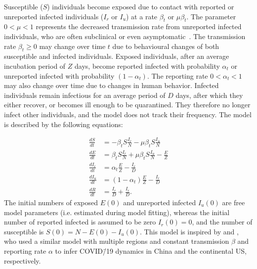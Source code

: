 \documentclass[12pt]{extarticle}
\newcommand{\covid}{COVID\=/19 }
\begin{document}
Susceptible ($S$) individuals become exposed due to contact with reported or unreported infected individuals ($I_r$ or $I_u$) at a rate $\beta_t$ or $\mu \beta_t$.
The parameter $0 < \mu < 1$ represents the decreased transmission rate from unreported infected individuals, who are often subclinical or even asymptomatic~\citep{Thompson2020,Ferretti2020}.
The transmission rate $\beta_t \ge 0$ may change over  time $t$ due to behavioural changes of both susceptible and infected individuals.
Exposed individuals, after an average incubation period of $Z$ days, become reported infected with probability $\alpha_t$ or unreported infected with probability $(1-\alpha_t)$.
The reporting rate $0 < \alpha_t < 1$ may also change over time due to changes in human behavior.
Infected individuals remain infectious for an average period of $D$ days, after which they either recover, or becomes ill enough to be quarantined.
They therefore no longer infect other individuals, and the model does not track their frequency.
The model is described by the following equations:

\begin{equation} \label{eq:model}
\begin{aligned}
\frac{dS}{dt} & = -\beta_t S \frac{I_r}{N} - \mu \beta_t S \frac{I_u}{N} \\
\frac{dE}{dt} & = \beta_t S \frac{I_r}{N} + \mu \beta_t S \frac{I_u}{N}  - \frac{E}{Z} \\
\frac{dI_r}{dt} & = \alpha_t \frac{E}{Z} - \frac{I_r}{D} \\
\frac{dI_u}{dt} & = (1-\alpha_t) \frac{E}{Z} - \frac{I_r}{D} \\
\frac{dR}{dt} & = \frac{I_r}{D} + \frac{I_r}{D} .
\end{aligned}
\end{equation}
The initial numbers of exposed $E(0)$ and unreported infected $I_u(0)$ are free model parameters (i.e. estimated during model fitting), whereas the initial number of reported infected is assumed to be zero $I_r(0)=0$, and the number of susceptible is $S(0)=N-E(0)-I_u(0)$.
This model is inspired by \citet{Li2020} and \citet{Pei2020}, who used a similar model with multiple regions and constant transmission $\beta$ and reporting rate $\alpha$ to infer \covid dynamics in China and the continental US, respectively.



\end{document}
